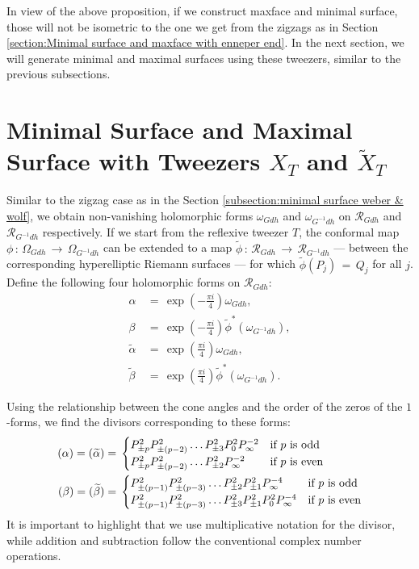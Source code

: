 \documentclass[12pt,epsfig,tikz,multi]{amsart}
\numberwithin{equation}{section}
\begin{document}
In view of the above proposition, if we construct maxface and minimal surface, those will not be isometric to the one we get from the zigzags as in Section \ref{section:Minimal surface and maxface with enneper end}. In the next section, we will generate minimal and maximal surfaces using these tweezers, similar to the previous subsections. 

\section{\textbf{Minimal Surface and Maximal Surface with Tweezers $X_T$ and $\widetilde{X}_T$}}

Similar to the zigzag case as in the Section \ref{subsection:minimal surface weber & wolf}, we obtain non-vanishing holomorphic forms $\omega_{Gdh}$ and $\omega_{G^{-1}dh}$ on $\mathcal{R}_{Gdh}$ and $\mathcal{R}_{G^{-1}dh}$ respectively.
If we 
start from the reflexive tweezer $T$, the conformal map $\phi\,:\, \Omega_{Gdh} \,\longrightarrow\, 
\Omega_{G^{-1}dh}$ can be extended to a map $\widetilde\phi\,:\, 
\mathcal{R}_{Gdh} \,\longrightarrow\, \mathcal{R}_{G^{-1}dh}$ --- between
the corresponding hyperelliptic Riemann surfaces --- for which $\widetilde\phi(P_j) \,=\, Q_j$ for all $j$.
Define the following four holomorphic forms on $\mathcal{R}_{Gdh}$:
\begin{align*}
    \alpha &\,=\,
\exp(-{\frac{\pi  i }{4}})\omega_{Gdh}, \\
    \beta &\,=\,
\exp(-{\frac{\pi  i }{4}})\widetilde{\phi}^*(\omega_{G^{-1}dh}), \\
    \widetilde\alpha &\,= \,
\exp({\frac{\pi  i }{4}})\omega_{Gdh}, \\
    \widetilde\beta &\,= \,
\exp({\frac{\pi  i }{4}})\widetilde{\phi}^*(\omega_{G^{-1}dh}).
\end{align*}

Using the relationship between the cone angles and the order of the zeros of the $1$-forms, we find the divisors 
corresponding to these forms:
\begin{align*}
    (\alpha) = (\widetilde\alpha) &=\,
    \begin{cases}
        P_{\pm p}^2 P_{\pm (p-2)}^2 \ldots P^2_{\pm 3}P^2_{0}P_{\infty}^{-2} & \text{if } p\color{black} \text{ is odd}\\
        P_{\pm p}^2 P_{\pm (p-2)}^2 \ldots P^2_{\pm 2}P_{\infty}^{-2} & \text{if } p\color{black} \text{ is even}
    \end{cases}\\
    (\beta) = (\widetilde\beta) &=\,
    \begin{cases}
        P_{\pm (p-1)}^2 P_{\pm (p-3)}^2 \ldots P^2_{\pm 2}P_{\pm 1}^2P_{\infty}^{-4} & \text{if } p\color{black} \text{ is odd}\\
        P_{\pm (p-1)}^2 P_{\pm (p-3)}^2 \ldots P_{\pm 3}^2P_{\pm 1}^2P_{0}^2P_{\infty}^{-4} & \text{if }  p\color{black} \text{ is even}
    \end{cases}
\end{align*}
It is important to highlight that we use multiplicative notation for the divisor, while addition and subtraction follow the conventional complex number operations.   
\end{document}
